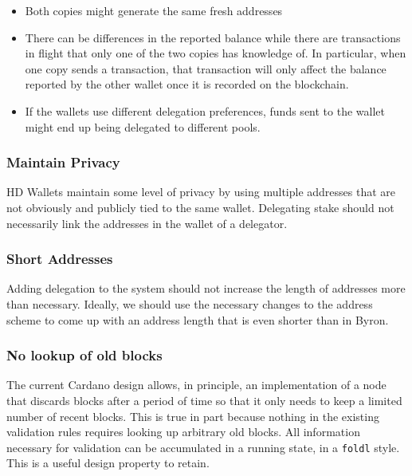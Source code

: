 \documentclass[11pt,a4paper]{article}
\begin{document}
\begin{itemize}
\item
  Both copies might generate the same fresh addresses
\item
  There can be differences in the reported balance while there are
  transactions in flight that only one of the two copies has knowledge
  of. In particular, when one copy sends a transaction, that transaction
  will only affect the balance reported by the other wallet once it is
  recorded on the blockchain.
\item
  If the wallets use different delegation preferences, funds sent to the
  wallet might end up being delegated to different pools.
\end{itemize}

\subsubsection{Maintain Privacy}
\label{maintain-privacy}

HD Wallets maintain some level of privacy by using multiple addresses
that are not obviously and publicly tied to the same wallet. Delegating
stake should not necessarily link the addresses in the wallet of a
delegator.

\subsubsection{Short Addresses}
\label{short-addresses}

Adding delegation to the system should not increase the length of
addresses more than necessary. Ideally, we should use the necessary
changes to the address scheme to come up with an address length that is
even shorter than in Byron.

\subsubsection{No lookup of old blocks}
\label{no-lookup-of-old-blocks}

The current Cardano design allows, in principle, an implementation of a
node that discards blocks after a period of time so that it only needs
to keep a limited number of recent blocks. This is true in part because
nothing in the existing validation rules requires looking up arbitrary
old blocks. All information necessary for validation can be accumulated
in a running state, in a \texttt{foldl} style. This is a useful design
property to retain.
\end{document}
